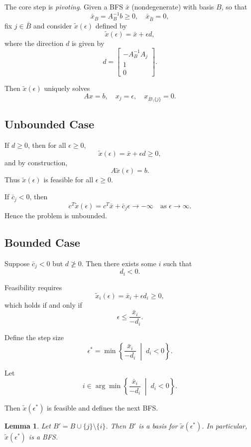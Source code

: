 \documentclass[12pt,oneside]{book}
\numberwithin{equation}{section}
\theoremstyle{definition}
\theoremstyle{plain}
\newtheorem{lemma}{Lemma}[section]
\theoremstyle{remark}
\begin{document}
The core step is \emph{pivoting}. Given a BFS $\bar{x}$ (nondegenerate) with basis $B$, so that
\[
\bar{x}_B = A_B^{-1} b \ge 0, \quad \bar{x}_{\bar{B}} = 0,
\]
fix $j \in \bar{B}$ and consider $\tilde{x}(\epsilon)$ defined by
\[
\tilde{x}(\epsilon) = \bar{x} + \epsilon d,
\]
where the direction $d$ is given by
\[
d =
\begin{bmatrix}
- A_B^{-1} A_j \\
1 \\
0
\end{bmatrix}.
\]

Then $\tilde{x}(\epsilon)$ uniquely solves
\[
Ax = b, \quad x_j = \epsilon, \quad x_{\bar{B} \setminus \{j\}} = 0.
\]

\subsection{Unbounded Case}

If $d \ge 0$, then for all $\epsilon \ge 0$,
\[
\tilde{x}(\epsilon) = \bar{x} + \epsilon d \ge 0,
\]
and by construction,
\[
A \tilde{x}(\epsilon) = b.
\]
Thus $\tilde{x}(\epsilon)$ is feasible for all $\epsilon \ge 0$.

If $\bar{c}_j < 0$, then
\[
c^T \tilde{x}(\epsilon)
= c^T \bar{x} + \bar{c}_j \epsilon \to -\infty
\quad \text{as } \epsilon \to \infty.
\]
Hence the problem is unbounded.

\subsection{Bounded Case}

Suppose $\bar{c}_j < 0$ but $d \not\ge 0$. Then there exists some $i$ such that
\[
d_i < 0.
\]

Feasibility requires
\[
\tilde{x}_i(\epsilon) = \bar{x}_i + \epsilon d_i \ge 0,
\]
which holds if and only if
\[
\epsilon \le \frac{\bar{x}_i}{-d_i}.
\]

Define the step size
\[
\epsilon^* = \min \left\{ \frac{\bar{x}_i}{-d_i} \;\middle|\; d_i < 0 \right\}.
\]

Let
\[
i \in \arg\min \left\{ \frac{\bar{x}_i}{-d_i} \;\middle|\; d_i < 0 \right\}.
\]

Then $\tilde{x}(\epsilon^*)$ is feasible and defines the next BFS.

\begin{lemma}
Let $B' = B \cup \{j\} \setminus \{i\}$. Then $B'$ is a basis for $\tilde{x}(\epsilon^*)$. In particular, $\tilde{x}(\epsilon^*)$ is a BFS.
\end{lemma}
\end{document}
